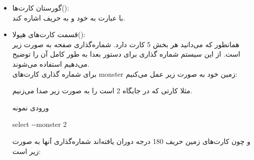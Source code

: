 \documentclass[]{article}
\begin{document}
\begin{itemize}
	\item گورستان کارت‌ها():
	\\
	با عبارت  به  خود و  
	به  حریف اشاره کند.
	\item قسمت کارت‌های هیولا():
	\\
	همانطور که می‌دانید هر بخش 5 کارت دارد. شماره‌گذاری صفحه به صورت زیر است. 
	از این سیستم شماره گذاری برای دستور  بعدا به طور کامل آن را 
	توضیح 
	می‌دهیم استفاده می‌شوند.
	\\
	برای شماره گذاری کارت‌های monster زمین خود به صورت زیر عمل می‌کنیم:
	
	\begin{center}
	\begin{latin}
	\begin{table}[h]
		\centering
	\end{table}
\end{latin}
\end{center}

	
	مثلا کارتی که در جایگاه 2 است را به صورت زیر صدا می‌زنیم.
	\begin{mybox}[colback=yellow]{ورودی نمونه}
		\begin{latin}	
			select -{}-monster 2
		\end{latin}
	\end{mybox}
	و چون کارت‌های زمین حریف 180 درجه دوران یافته‌اند شماره‌گذاری آنها به صورت 
	زیر است:
	
		\begin{center}
		\begin{latin}
			\begin{table}[h]
				\centering
\end{table}
\end{latin}
\end{center}
\end{itemize}
\end{document}
